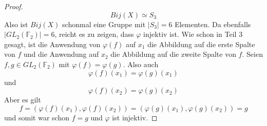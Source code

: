 \documentclass[10pt,a4paper]{article}
\begin{document}
\begin{proof}
  \begin{equation}
    Bij(X) \simeq S_{3}
  \end{equation}
  Also ist $Bij(X)$ schonmal eine Gruppe mit $|S_{3}| = 6$ Elementen.
  Da ebenfalls $|GL_{2}(\mathbb{F}_{2})| = 6$, reicht es zu zeigen, dass $\varphi$ injektiv ist.
  Wie schon in Teil 3 gesagt, ist die Anwendung von $\varphi(f)$ auf $x_{1}$ die Abbildung auf die erste Spalte von $f$ und die Anwendung auf $x_{2}$ die Abbildung auf die zweite Spalte von $f$.
  Seien $f, g \in GL_{2}(\mathbb{F}_{2})$ mit $\varphi(f) = \varphi(g)$.
  Also auch
  \begin{equation}
    \varphi(f)(x_{1}) = \varphi(g)(x_{1})
  \end{equation}
  und
  \begin{equation}
    \varphi(f)(x_{2}) = \varphi(g)(x_{2})
  \end{equation}
  Aber es gilt
  \begin{equation}
    f = \left( \varphi(f)(x_{1}), \varphi(f)(x_{2}) \right) = \left( \varphi(g)(x_{1}), \varphi(g)(x_{2}) \right) = g
  \end{equation}
  und somit war schon $f = g$ und $\varphi$ ist injektiv.
\end{proof}
\end{document}
